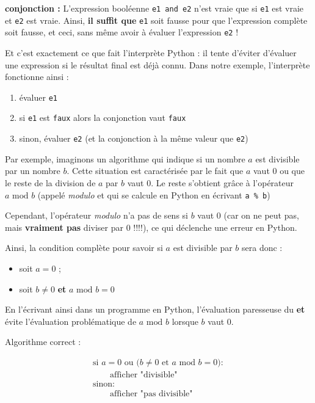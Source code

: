 \documentclass[a4paper,17pt]{extarticle}
\providecommand{\tightlist}{%
      \setlength{\itemsep}{0pt}\setlength{\parskip}{0pt}}
\begin{document}
\begin{remarque}
\textbf{conjonction :} L'expression booléenne \texttt{e1\ and\ e2} n'est
vraie que si \texttt{e1} est vraie et \texttt{e2} est vraie. Ainsi,
\textbf{il suffit que} \texttt{e1} soit fausse pour que l'expression
complète soit fausse, et ceci, sans même avoir à évaluer l'expression
\texttt{e2} !

Et c'est exactement ce que fait l'interprète Python : il tente d'éviter
d'évaluer une expression si le résultat final est déjà connu. Dans notre
exemple, l'interprète fonctionne ainsi :

\begin{enumerate}
\def\labelenumi{\arabic{enumi}.}
\tightlist
\item
  évaluer \texttt{e1}
\item
  si \texttt{e1} est \texttt{faux} alors la conjonction vaut
  \texttt{faux}
\item
  sinon, évaluer \texttt{e2} (et la conjonction à la même valeur que
  \texttt{e2})
\end{enumerate}

        \end{remarque}\begin{exemple}
    Par exemple, imaginons un algorithme qui indique si un nombre \(a\) est
divisible par un nombre \(b\). Cette situation est caractérisée par le
fait que \(a\) vaut \(0\) ou que le reste de la division de \(a\) par
\(b\) vaut \(0\). Le reste s'obtient grâce à l'opérateur
\(a \text{ mod } b\) (appelé \emph{modulo} et qui se calcule en Python
en écrivant \texttt{a\ \%\ b})

Cependant, l'opérateur \emph{modulo} n'a pas de sens si \(b\) vaut \(0\)
(car on ne peut pas, mais \textbf{vraiment pas} diviser par \(0\) !!!!),
ce qui déclenche une erreur en Python.

Ainsi, la condition complète pour savoir si \(a\) est divisible par
\(b\) sera donc :

\begin{itemize}
\tightlist
\item
  soit \(a = 0\) ;
\item
  soit \(b \neq 0\) \textbf{et} \(a \text{ mod } b = 0\)
\end{itemize}

En l'écrivant ainsi dans un programme en Python, l'évaluation paresseuse
du \textbf{et} évite l'évaluation problématique de \(a \text{ mod } b\)
lorsque \(b\) vaut 0.

Algorithme correct :

\[
\begin{array}{ll}
\text{si $a=0$ ou $\big( b \neq 0$ et $a$ mod $b = 0 \big):$}\\
\qquad \text{afficher "divisible"}\\
\text{sinon:}\\
\qquad \text{afficher "pas divisible"}
\end{array}
\]


\end{exemple}
\end{document}
